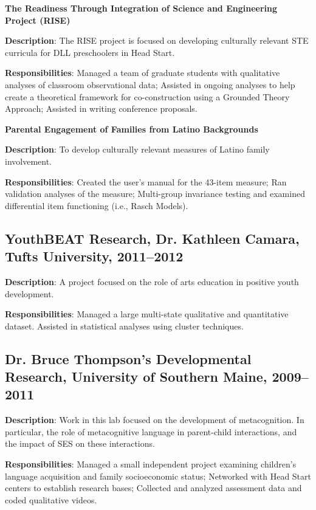 \documentclass[letterpaper]{article}
\renewenvironment{itemize}{
  \begin{list}{}{
    \setlength{\leftmargin}{1.5em}
  }
}{
  \end{list}
}
\begin{document}
\textbf{The Readiness Through Integration of Science and Engineering Project (RISE)}
\begin{itemize}
\item \textbf{Description}: The RISE project is focused on developing culturally relevant STE curricula for DLL preschoolers in Head Start.  
\item \textbf{Responsibilities}: Managed a team of graduate students with qualitative analyses of classroom observational data; Assisted in ongoing analyses to help create a theoretical framework for co-construction using a Grounded Theory Approach; Assisted in writing conference proposals. 
\end{itemize}

\textbf{Parental Engagement of Families from Latino Backgrounds}
\begin{itemize}
\item \textbf{Description}: To develop culturally relevant measures of Latino family involvement. 
\item \textbf{Responsibilities}: Created the user's manual for the 43-item measure; Ran validation analyses of the measure; Multi-group invariance testing and examined differential item functioning (i.e., Rasch Models). 
\end{itemize}

\subsection*{YouthBEAT Research, Dr. Kathleen Camara, Tufts University, 2011--2012}
\begin{itemize}
\item \textbf{Description}: A project focused on the role of arts education in positive youth development. 
\item \textbf{Responsibilities}: Managed a large multi-state qualitative and quantitative dataset. Assisted in statistical analyses using cluster techniques.
\end{itemize} 

\subsection*{Dr. Bruce Thompson's Developmental Research, University of Southern Maine, 2009--2011}
\begin{itemize}
\item \textbf{Description}: Work in this lab focused on the development of metacognition. In particular, the role of metacognitive language in parent-child interactions, and the impact of SES on these interactions. 
\item \textbf{Responsibilities}: Managed a small independent project examining children's language acquisition and family socioeconomic status; Networked with Head Start centers to establish research bases; Collected and analyzed assessment data and coded qualitative videos.
\end{itemize} 
\end{document}
